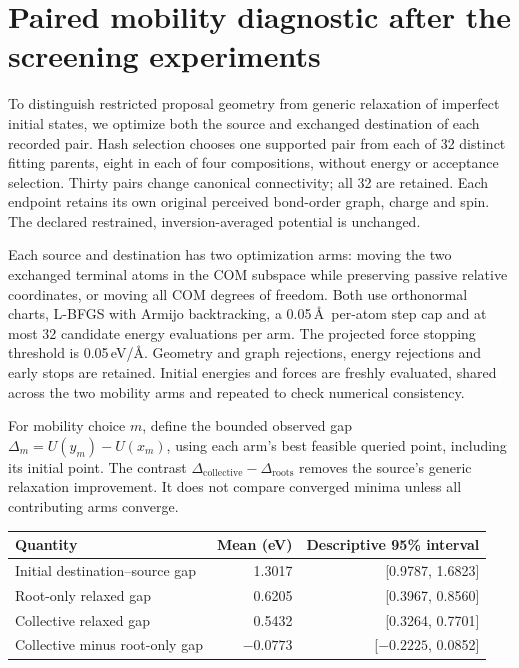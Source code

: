 \section{Paired mobility diagnostic after the screening experiments}
\label{app:mobility-diagnostic}

To distinguish restricted proposal geometry from generic relaxation of imperfect
initial states, we optimize both the source and exchanged destination of each
recorded pair. Hash selection chooses one supported pair from each of 32 distinct
fitting parents, eight in each of four compositions, without energy or acceptance
selection. Thirty pairs change canonical connectivity; all 32 are retained.
Each endpoint retains its own original perceived bond-order graph, charge and
spin. The declared restrained, inversion-averaged potential is unchanged.

Each source and destination has two optimization arms: moving the two exchanged
terminal atoms in the COM subspace while preserving passive relative coordinates,
or moving all COM degrees of freedom. Both use orthonormal charts, L-BFGS with
Armijo backtracking, a 0.05\,\AA\ per-atom step cap and at most 32 candidate energy
evaluations per arm. The projected force stopping threshold is
0.05\,eV/\AA. Geometry and graph rejections, energy rejections and early stops are
retained. Initial energies and forces are freshly evaluated, shared across the
two mobility arms and repeated to check numerical consistency.

For mobility choice $m$, define the bounded observed gap
$\Delta_m=U(y_m)-U(x_m)$, using each arm's best feasible queried point, including
its initial point. The contrast $\Delta_{\mathrm{collective}}-
\Delta_{\mathrm{roots}}$ removes the source's generic relaxation improvement.
It does not compare converged minima unless all contributing arms converge.

\begin{center}
\small
\begin{tabular}{lrr}
\toprule
Quantity & Mean (eV) & Descriptive 95\% interval \\
\midrule
Initial destination--source gap & 1.3017 & [0.9787, 1.6823] \\
Root-only relaxed gap & 0.6205 & [0.3967, 0.8560] \\
Collective relaxed gap & 0.5432 & [0.3264, 0.7701] \\
Collective minus root-only gap & $-0.0773$ & [$-0.2225$, 0.0852] \\
\bottomrule
\end{tabular}
\end{center}

